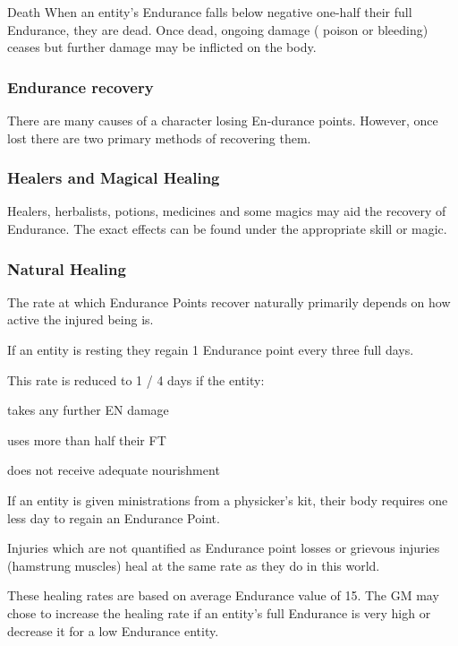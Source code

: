 \begin{multicols*}{3}
\begin{Description}
\item[Death] When an entity's Endurance falls below negative one-half
their full Endurance, they are dead. Once dead, ongoing damage (\eg
poison or bleeding) ceases but further damage may be inflicted on the
body.
\end{Description}

\subsubsection{Endurance recovery}

There are many causes of a character losing En-durance
points. However, once lost there are two primary methods of recovering
them.

\subsubsection{Healers and Magical Healing}

Healers, herbalists, potions, medicines and some magics may aid the
recovery of Endurance. The exact effects can be found under the
appropriate skill or magic.

\subsubsection{Natural Healing}

The rate at which Endurance Points recover naturally primarily depends
on how active the injured being is.

If an entity is resting they regain 1 Endurance point every three full
days.

This rate is reduced to 1 / 4 days if the entity:
\begin{Itemize}
\item takes any further EN damage 
\item uses more than half their FT
\item does not receive adequate nourishment
\end{Itemize}

If an entity is given ministrations from a physicker's kit, their body
requires one less day to regain an Endurance Point.

Injuries which are not quantified as Endurance point losses or
grievous injuries (\eg hamstrung muscles) heal at the same rate as
they do in this world.

These healing rates are based on average Endurance value of 15. The GM
may chose to increase the healing rate if an entity's full Endurance
is very high or decrease it for a low Endurance entity.


\end{multicols*}
